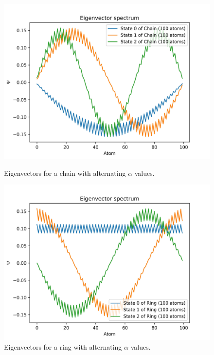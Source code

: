 \documentclass{article}
\begin{document}
\begin{figure}[h]
    \centering
    \begin{minipage}{0.45\textwidth}
        \centering
        \includegraphics[width=\textwidth]{Figures/chain_alpha_eigenvectors.jpg}
        \caption{Eigenvectors for a chain with alternating $\alpha$ values.}
        \label{fig:chain_alpha_eigenvectors}
    \end{minipage}
    \hfill
    \begin{minipage}{0.45\textwidth}
        \centering
        \includegraphics[width=\textwidth]{Figures/ring_alpha_eigenvectors.jpg}
        \caption{Eigenvectors for a ring with alternating $\alpha$ values.}
        \label{fig:ring_alpha_eigenvectors}
    \end{minipage}
\end{figure}
\end{document}
